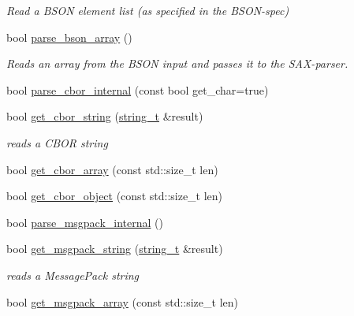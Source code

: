 \begin{DoxyCompactItemize}
\begin{DoxyCompactList}\small\item\em Read a B\+S\+ON element list (as specified in the B\+S\+O\+N-\/spec) \end{DoxyCompactList}\item 
bool \mbox{\hyperlink{classnlohmann_1_1detail_1_1binary__reader_a650dd6f9f05e86eb62cd4717301a5ffa}{parse\+\_\+bson\+\_\+array}} ()
\begin{DoxyCompactList}\small\item\em Reads an array from the B\+S\+ON input and passes it to the S\+A\+X-\/parser. \end{DoxyCompactList}\item 
bool \mbox{\hyperlink{classnlohmann_1_1detail_1_1binary__reader_a2fc47768d484a22fcd04e20106da1399}{parse\+\_\+cbor\+\_\+internal}} (const bool get\+\_\+char=true)
\item 
bool \mbox{\hyperlink{classnlohmann_1_1detail_1_1binary__reader_acca76844160000e1d8215cb5c7afbba1}{get\+\_\+cbor\+\_\+string}} (\mbox{\hyperlink{classnlohmann_1_1detail_1_1binary__reader_aa0b9729917ca7ee6ed01e3792341316e}{string\+\_\+t}} \&result)
\begin{DoxyCompactList}\small\item\em reads a C\+B\+OR string \end{DoxyCompactList}\item 
bool \mbox{\hyperlink{classnlohmann_1_1detail_1_1binary__reader_ac3dc99d36754aa0beac506b30604a8ed}{get\+\_\+cbor\+\_\+array}} (const std\+::size\+\_\+t len)
\item 
bool \mbox{\hyperlink{classnlohmann_1_1detail_1_1binary__reader_a2fcc776cd2c7bb52bbc511e97d36978a}{get\+\_\+cbor\+\_\+object}} (const std\+::size\+\_\+t len)
\item 
bool \mbox{\hyperlink{classnlohmann_1_1detail_1_1binary__reader_a81611d8a5faec1348d31f7e98fcd05ef}{parse\+\_\+msgpack\+\_\+internal}} ()
\item 
bool \mbox{\hyperlink{classnlohmann_1_1detail_1_1binary__reader_a5526ed98ca4c436cbae6f8a77ea207b8}{get\+\_\+msgpack\+\_\+string}} (\mbox{\hyperlink{classnlohmann_1_1detail_1_1binary__reader_aa0b9729917ca7ee6ed01e3792341316e}{string\+\_\+t}} \&result)
\begin{DoxyCompactList}\small\item\em reads a Message\+Pack string \end{DoxyCompactList}\item 
bool \mbox{\hyperlink{classnlohmann_1_1detail_1_1binary__reader_a09d3eed7523da6f61e7ffa98823aae2b}{get\+\_\+msgpack\+\_\+array}} (const std\+::size\+\_\+t len)

\end{DoxyCompactItemize}
